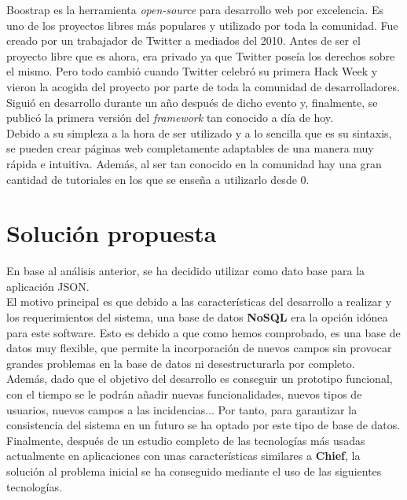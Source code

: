 Boostrap\cite{bootstrap} es la herramienta \textit{open-source} para desarrollo web por excelencia. Es uno de los proyectos libres más populares y utilizado por toda la comunidad.
Fue creado por un trabajador de Twitter a mediados del 2010. Antes de ser el proyecto libre que es ahora, era privado ya que Twitter poseía los derechos sobre el mismo.
Pero todo cambió cuando Twitter celebró su primera Hack Week\cite{hack-week} y vieron la acogida del proyecto por parte de toda la comunidad de desarrolladores. Siguió en desarrollo
durante un año después de dicho evento y, finalmente, se publicó la primera versión del \textit{framework} tan conocido a día de hoy.\\

Debido a su simpleza a la hora de ser utilizado y a lo sencilla que es su sintaxis, se pueden crear páginas web completamente adaptables de una manera muy rápida e intuitiva. Además, al ser tan conocido en la comunidad hay una gran cantidad de tutoriales en los que se enseña a utilizarlo desde 0.

\newpage

\section{Solución propuesta}

En base al análisis anterior, se ha decidido utilizar como dato base para la aplicación JSON\cite{json}.\\

El motivo principal es que debido a las características del desarrollo a realizar y los requerimientos del sistema,
una base de datos \textbf{NoSQL} era la opción idónea para este software. Esto es debido a que como hemos comprobado,
es una base de datos muy flexible, que permite la incorporación de nuevos campos sin provocar grandes problemas en 
la base de datos ni desestructurarla por completo.\\

Además, dado que el objetivo del desarrollo es conseguir un prototipo funcional, con el tiempo se le podrán añadir
nuevas funcionalidades, nuevos tipos de usuarios, nuevos campos a las incidencias... Por tanto, para garantizar 
la consistencia del sistema en un futuro se ha optado por este tipo de base de datos.\\

Finalmente, después de un estudio completo de las tecnologías más usadas actualmente en aplicaciones con unas características similares a \textbf{Chief}, la solución al problema inicial se ha conseguido 
mediante el uso de las siguientes tecnologías.

